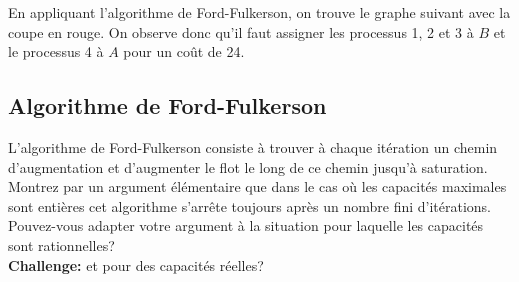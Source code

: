 \begin{solution}
  En appliquant l'algorithme de Ford-Fulkerson, on trouve le graphe suivant
  avec la coupe en rouge.
  On observe donc qu'il faut assigner les processus 1, 2 et 3 à $B$
  et le processus 4 à $A$ pour un coût de 24.
  \begin{center}
  \end{center}
\end{solution}

\subsection{Algorithme de Ford-Fulkerson}
L'algorithme de Ford-Fulkerson consiste à trouver à chaque itération un chemin d'augmentation et d'augmenter le flot le long de ce chemin jusqu'à saturation. Montrez par un argument élémentaire que dans le cas où les capacités maximales sont entières cet algorithme s'arrête toujours après un nombre fini d'itérations. Pouvez-vous adapter votre argument à la situation pour laquelle les capacités sont rationnelles? \\
\textbf{Challenge:} et pour des capacités réelles?

